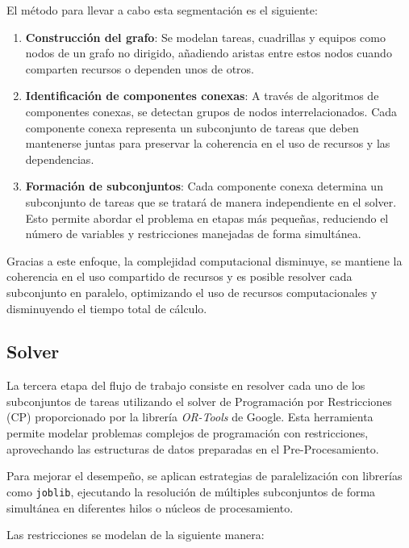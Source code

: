 \documentclass{article}
\begin{document}
El método para llevar a cabo esta segmentación es el siguiente:

\begin{enumerate}[label=\alph*.]
    \item \textbf{Construcción del grafo}: Se modelan tareas, cuadrillas y equipos como nodos de un grafo no dirigido, añadiendo aristas entre estos nodos cuando comparten recursos o dependen unos de otros.
    
    \item \textbf{Identificación de componentes conexas}: A través de algoritmos de componentes conexas, se detectan grupos de nodos interrelacionados. Cada componente conexa representa un subconjunto de tareas que deben mantenerse juntas para preservar la coherencia en el uso de recursos y las dependencias.

    \item \textbf{Formación de subconjuntos}: Cada componente conexa determina un subconjunto de tareas que se tratará de manera independiente en el solver. Esto permite abordar el problema en etapas más pequeñas, reduciendo el número de variables y restricciones manejadas de forma simultánea.
\end{enumerate}

Gracias a este enfoque, la complejidad computacional disminuye, se mantiene la coherencia en el uso compartido de recursos y es posible resolver cada subconjunto en paralelo, optimizando el uso de recursos computacionales y disminuyendo el tiempo total de cálculo.


\subsection{Solver}

La tercera etapa del flujo de trabajo consiste en resolver cada uno de los subconjuntos de tareas utilizando el solver de Programación por Restricciones (CP) proporcionado por la librería \textit{OR-Tools} de Google. Esta herramienta permite modelar problemas complejos de programación con restricciones, aprovechando las estructuras de datos preparadas en el Pre-Procesamiento.

Para mejorar el desempeño, se aplican estrategias de paralelización con librerías como \texttt{joblib}, ejecutando la resolución de múltiples subconjuntos de forma simultánea en diferentes hilos o núcleos de procesamiento.

Las restricciones se modelan de la siguiente manera:
\end{document}
